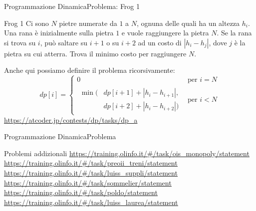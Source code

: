 \documentclass{beamer}
\begin{document}
%
\begin{frame}{Programmazione Dinamica}{Problema: Frog 1}
    \begin{exampleblock}{Frog 1}
        Ci sono $N$ pietre numerate da $1$ a $N$, ognuna delle quali ha un altezza $h_i$. Una rana \`e inizialmente sulla pietra $1$ e vuole raggiungere la pietra $N$. Se la rana si trova su $i$, pu\`o saltare su $i+1$ o su $i+2$ ad un costo di $|h_i - h_j|$, dove $j$ \`e la pietra su cui atterra. Trova il minimo costo per raggiungere $N$.
    \end{exampleblock}
    \pause
    Anche qui possiamo definire il problema ricorsivamente:
    \[
        dp[i] =
        \begin{cases}
            0 & \text{per } i = N \\
            \begin{split}
                \min(& dp[i+1] + |h_i - h_{i+1}| , \\
                     & dp[i+2] + |h_i - h_{i+2}|)
            \end{split} & \text{per } i < N
        \end{cases}
    \]
    \pause
    \small{\underline{\url{https://atcoder.jp/contests/dp/tasks/dp_a}}}
\end{frame}
%
\begin{frame}{Programmazione Dinamica}{Problema}
\end{frame}
%
\begin{frame}{Problemi addizionali}
    \underline{\url{https://training.olinfo.it/\#/task/ois_monopoly/statement}}
    \underline{\url{https://training.olinfo.it/\#/task/preoii_treni/statement}}
    \underline{\url{https://training.olinfo.it/\#/task/luiss_suppli/statement}}
    \underline{\url{https://training.olinfo.it/\#/task/sommelier/statement}}
    \underline{\url{https://training.olinfo.it/\#/task/poldo/statement}}
    \underline{\url{https://training.olinfo.it/\#/task/luiss_laurea/statement}}
\end{frame}
%
\end{document}
